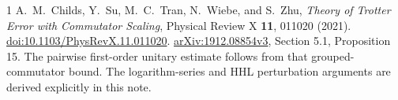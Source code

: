 \documentclass[11pt,a4paper]{article}
\begin{document}

\begin{thebibliography}{1}
A.~M.~Childs, Y.~Su, M.~C.~Tran, N.~Wiebe, and S.~Zhu,
\emph{Theory of Trotter Error with Commutator Scaling},
Physical Review X \textbf{11}, 011020 (2021).
\href{https://doi.org/10.1103/PhysRevX.11.011020}{doi:10.1103/PhysRevX.11.011020}.
\href{https://arxiv.org/html/1912.08854v3}{arXiv:1912.08854v3}, Section 5.1, Proposition 15.
The pairwise first-order unitary estimate follows from that grouped-commutator bound. The logarithm-series and HHL perturbation arguments are derived explicitly in this note.
\end{thebibliography}
\end{document}
